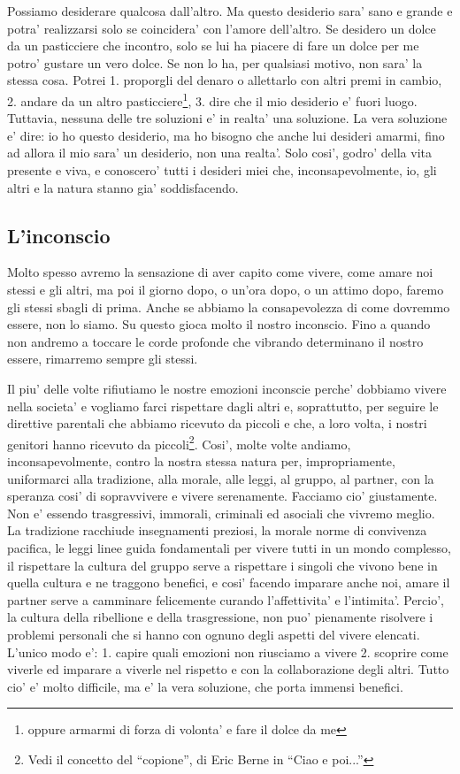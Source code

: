 Possiamo desiderare qualcosa dall'altro. Ma questo desiderio sara' sano e grande e potra' realizzarsi solo se coincidera' con l'amore dell'altro. Se desidero un dolce da un pasticciere che incontro, solo se lui ha piacere di fare un dolce per me potro' gustare un vero dolce. Se non lo ha, per qualsiasi motivo, non sara' la stessa cosa. Potrei 1. proporgli del denaro o allettarlo con altri premi in cambio, 2. andare da un altro pasticciere\footnote{oppure armarmi di forza di volonta' e fare il dolce da me}, 3. dire che il mio desiderio e' fuori luogo. Tuttavia, nessuna delle tre soluzioni e' in realta' una soluzione. La vera soluzione e' dire: io ho questo desiderio, ma ho bisogno che anche lui desideri amarmi, fino ad allora il mio sara' un desiderio, non una realta'. Solo cosi', godro' della vita presente e viva, e conoscero' tutti i desideri miei che, inconsapevolmente, io, gli altri e la natura stanno gia' soddisfacendo.

\subsection{L'inconscio}

Molto spesso avremo la sensazione di aver capito come vivere, come amare noi stessi e gli altri, ma poi il giorno dopo, o un'ora dopo, o un attimo dopo, faremo gli stessi sbagli di prima. Anche se abbiamo la consapevolezza di come dovremmo essere, non lo siamo. Su questo gioca molto il nostro inconscio. Fino a quando non andremo a toccare le corde profonde che vibrando determinano il nostro essere, rimarremo sempre gli stessi. 

Il piu' delle volte rifiutiamo le nostre emozioni inconscie perche' dobbiamo vivere nella societa' e vogliamo farci rispettare dagli altri e, soprattutto, per seguire le direttive parentali che abbiamo ricevuto da piccoli e che, a loro volta, i nostri genitori hanno ricevuto da piccoli\footnote{Vedi il concetto del ``copione'', di Eric Berne in ``Ciao e poi...''}. Cosi', molte volte andiamo, inconsapevolmente, contro la nostra stessa natura per, impropriamente, uniformarci alla tradizione, alla morale, alle leggi, al gruppo, al partner, con la speranza cosi' di sopravvivere e vivere serenamente. Facciamo cio' giustamente. Non e' essendo trasgressivi, immorali, criminali ed asociali che vivremo meglio. La tradizione racchiude insegnamenti preziosi, la morale norme di convivenza pacifica, le leggi linee guida fondamentali per vivere tutti in un mondo complesso, il rispettare la cultura del gruppo serve a rispettare i singoli che vivono bene in quella cultura e ne traggono benefici, e cosi' facendo imparare anche noi, amare il partner serve a camminare felicemente curando l'affettivita' e l'intimita'. Percio', la cultura della ribellione e della trasgressione, non puo' pienamente risolvere i problemi personali che si hanno con ognuno degli aspetti del vivere elencati. L'unico modo e': 1. capire quali emozioni non riusciamo a vivere 2. scoprire come viverle ed imparare a viverle nel rispetto e con la collaborazione degli altri. Tutto cio' e' molto difficile, ma e' la vera soluzione, che porta immensi benefici. 

